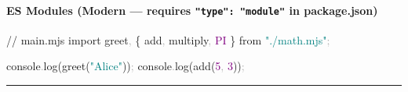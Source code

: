 \documentclass[
  justified,
  openright,
]{tufte-book}
\let\subsubsection\paragraph
\let\paragraph\paragraph
\newcommand{\BuiltInTok}[1]{#1}
\newcommand{\CommentTok}[1]{\textcolor{MidGray}{#1}}
\newcommand{\ConstantTok}[1]{\textcolor{Purple}{#1}}
\newcommand{\ControlFlowTok}[1]{\textcolor{BrandBlue}{#1}}
\newcommand{\DecValTok}[1]{\textcolor{Purple}{#1}}
\newcommand{\FunctionTok}[1]{\textcolor{BrandBlue}{#1}}
\newcommand{\ImportTok}[1]{\textcolor{BrandAccent}{#1}}
\newcommand{\KeywordTok}[1]{\textcolor{BrandBlue}{#1}}
\newcommand{\NormalTok}[1]{#1}
\newcommand{\OperatorTok}[1]{\textcolor{DarkGray}{#1}}
\newcommand{\SpecialCharTok}[1]{\textcolor{Teal}{#1}}
\newcommand{\StringTok}[1]{\textcolor{Teal}{#1}}
\newcommand{\VerbatimStringTok}[1]{\textcolor{Teal}{#1}}
\newenvironment{Shaded}{%
  \begin{snugshade}
}{%
  \end{snugshade}
}
\let\subsubsection\paragraph
\let\paragraph\paragraph
\begin{document}
\subsubsection{\texorpdfstring{ES Modules (Modern --- requires
\texttt{"type":\ "module"} in
package.json)}{ES Modules (Modern --- requires "type": "module" in package.json)}}\label{es-modules-modern-requires-type-module-in-package.json}

\begin{Shaded}
\end{Shaded}

\begin{Shaded}
\begin{Highlighting}[]
\CommentTok{// main.mjs}
\ImportTok{import}\NormalTok{ greet}\OperatorTok{,}\NormalTok{ \{ add}\OperatorTok{,}\NormalTok{ multiply}\OperatorTok{,} \ConstantTok{PI}\NormalTok{ \} }\ImportTok{from} \StringTok{"./math.mjs"}\OperatorTok{;}

\BuiltInTok{console}\OperatorTok{.}\FunctionTok{log}\NormalTok{(}\FunctionTok{greet}\NormalTok{(}\StringTok{"Alice"}\NormalTok{))}\OperatorTok{;}
\BuiltInTok{console}\OperatorTok{.}\FunctionTok{log}\NormalTok{(}\FunctionTok{add}\NormalTok{(}\DecValTok{5}\OperatorTok{,} \DecValTok{3}\NormalTok{))}\OperatorTok{;}
\end{Highlighting}
\end{Shaded}

\begin{center}\rule{0.5\linewidth}{0.5pt}\end{center}
\end{document}
